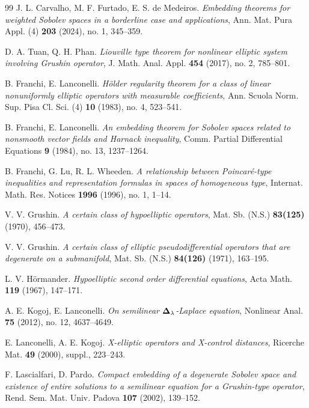 \documentclass[12pt]{amsart}
\begin{document}
\begin{thebibliography}{99}
J. L. Carvalho, M. F. Furtado, E. S. de Medeiros.
\textit{Embedding theorems for weighted Sobolev spaces in a borderline case and applications},
Ann. Mat. Pura Appl. (4) {\bf 203} (2024), no. 1, 345--359.


D. A. Tuan, Q. H. Phan.
\textit{Liouville type theorem for nonlinear elliptic system involving Grushin operator},
J. Math. Anal. Appl. {\bf 454} (2017), no. 2, 785--801.

B. Franchi, E. Lanconelli.
\textit{H\"older regularity theorem for a class of linear nonuniformly elliptic operators with measurable coefficients},
Ann. Scuola Norm. Sup. Pisa Cl. Sci. (4) {\bf 10} (1983), no. 4, 523--541.

B. Franchi, E. Lanconelli.
\textit{An embedding theorem for Sobolev spaces related to nonsmooth vector fields and Harnack inequality},
Comm. Partial Differential Equations {\bf 9} (1984), no. 13, 1237--1264.

B. Franchi, G. Lu, R. L. Wheeden.
\textit{A relationship between Poincar\'e-type inequalities and representation formulas in spaces of homogeneous type},
Internat. Math. Res. Notices {\bf 1996} (1996), no. 1, 1--14.

V. V. Grushin.
\textit{A certain class of hypoelliptic operators},
Mat. Sb. (N.S.) {\bf 83(125)} (1970), 456--473.

V. V. Grushin.
\textit{A certain class of elliptic pseudodifferential operators that are degenerate on a submanifold},
Mat. Sb. (N.S.) {\bf 84(126)} (1971), 163--195.

L. V. H\"ormander.
\textit{Hypoelliptic second order differential equations},
Acta Math. {\bf 119} (1967), 147--171.

A. E. Kogoj, E. Lanconelli.
\textit{On semilinear ${\bf \Delta}_{\bf \lambda}$-Laplace equation},
Nonlinear Anal. {\bf 75} (2012), no. 12, 4637--4649.

E. Lanconelli, A. E. Kogoj.
\textit{X-elliptic operators and X-control distances},
Ricerche Mat. {\bf 49} (2000), suppl., 223--243.

F. Lascialfari, D. Pardo.
\textit{Compact embedding of a degenerate Sobolev space and existence of entire solutions to a semilinear equation for a Grushin-type operator},
Rend. Sem. Mat. Univ. Padova {\bf 107} (2002), 139--152.


\end{thebibliography}
\end{document}
